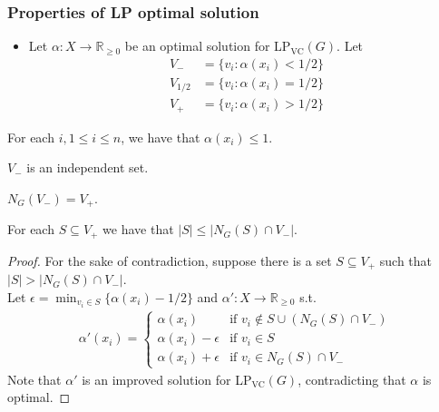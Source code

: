 \begin{frame}
 \frametitle{Properties of LP optimal solution}

 \begin{itemize}
  \item Let $\alpha: X\rightarrow \mathbb{R}_{\ge 0}$ be an optimal solution for LP$_{\text{VC}}(G)$.
        Let
 \begin{align*}
  V_- &= \{v_i : \alpha(x_i) < 1/2\}\\
  V_{1/2} &= \{v_i : \alpha(x_i) = 1/2\}\\
  V_+ &= \{v_i : \alpha(x_i) > 1/2\}
 \end{align*}
 \end{itemize}

 \pause
 \begin{lemma}
  For each $i, 1\le i\le n$, we have that $\alpha(x_i)\le 1$.
 \end{lemma}
 
 \begin{lemma}
  $V_-$ is an independent set. %
 \end{lemma}

 \begin{lemma}
  $N_G(V_-)=V_+$. %
 \end{lemma}

\end{frame}


\begin{frame}

 \begin{lemma}
  For each $S\subseteq V_+$ we have that $|S| \le |N_G(S) \cap V_-|$. %
 \end{lemma}
 \begin{proof}
  For the sake of contradiction, suppose there is a set $S\subseteq V_+$ such that $|S| > |N_G(S) \cap V_-|$.\\
  Let $\epsilon = \min_{v_i\in S}\{\alpha(x_i)-1/2\}$ and $\alpha':X\rightarrow \mathbb{R}_{\ge 0}$ s.t.
  \begin{align*}
   \alpha'(x_i) = \begin{cases}
                   \alpha(x_i) &\text{if } v_i \notin S\cup (N_G(S) \cap V_-)\\
                   \alpha(x_i)-\epsilon &\text{if } v_i \in S\\
                   \alpha(x_i)+\epsilon &\text{if } v_i \in N_G(S)\cap V_-
                  \end{cases}
  \end{align*}
  Note that $\alpha'$ is an improved solution for LP$_{\text{VC}}(G)$, contradicting that $\alpha$ is optimal.
 \end{proof}
\end{frame}



